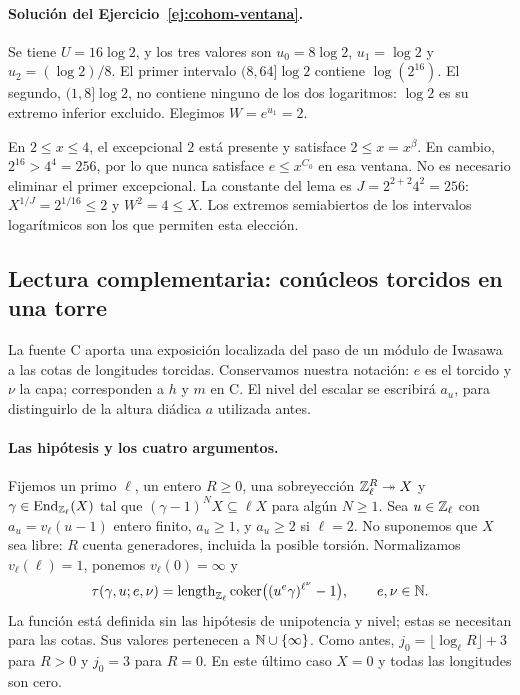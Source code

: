 \paragraph{Solución del Ejercicio~\ref{ej:cohom-ventana}.}
Se tiene $U=16\log2$, y los tres valores son
$u_0=8\log2$, $u_1=\log2$ y
$u_2=(\log2)/8$.
El primer intervalo $(8,64]\log2$ contiene
$\log(2^{16})$.
El segundo, $(1,8]\log2$, no contiene ninguno de los
dos logaritmos: $\log2$ es su extremo inferior
excluido. Elegimos $W=e^{u_1}=2$.

En $2\le x\le4$, el excepcional $2$ está presente
y satisface $2\le x=x^\beta$.
En cambio, $2^{16}>4^4=256$, por lo que nunca
satisface $e\le x^{C_0}$ en esa ventana.
No es necesario eliminar el primer excepcional.
La constante del lema es
$J=2^{2+2}4^2=256$:
$X^{1/J}=2^{1/16}\le2$ y $W^2=4\le X$.
Los extremos semiabiertos de los intervalos
logarítmicos son los que permiten esta elección.

\subsection{Lectura complementaria: conúcleos torcidos en una torre}
\label{subsec:cohom-fuente-c}


La fuente C aporta una exposición localizada del paso de un módulo
de Iwasawa a las cotas de longitudes torcidas. Conservamos nuestra
notación: $e$ es el torcido y $\nu$ la capa; corresponden a $h$ y $m$
en C. El nivel del escalar se escribirá $a_u$, para distinguirlo
de la altura diádica $a$ utilizada antes.

\paragraph{Las hipótesis y los cuatro argumentos.}
Fijemos un primo $\ell$, un entero $R\ge0$, una sobreyección
$\mathbb{Z}_\ell^R\twoheadrightarrow X$
y $\gamma\in\operatorname{End}_{\mathbb{Z}_\ell}(X)$ tal que
$(\gamma-1)^N X\subseteq\ell X$ para algún $N\ge1$.
Sea $u\in\mathbb{Z}_\ell$ con
$a_u=v_\ell(u-1)$ entero finito, $a_u\ge1$, y $a_u\ge2$ si $\ell=2$.
No suponemos que $X$ sea libre: $R$ cuenta generadores, incluida
la posible torsión. Normalizamos $v_\ell(\ell)=1$, ponemos
$v_\ell(0)=\infty$ y
\[
 \tau(\gamma,u;e,\nu)=
 \operatorname{length}_{\mathbb{Z}_\ell}\operatorname{coker}
       \bigl((u^e\gamma)^{\ell^\nu}-1\bigr),
 \qquad e,\nu\in\mathbb{N}.
\]
La función está definida sin las hipótesis de unipotencia y nivel;
estas se necesitan para las cotas. Sus valores pertenecen a
$\mathbb{N}\cup\{\infty\}$. Como antes,
$j_0=\lfloor\log_\ell R\rfloor+3$ para $R>0$ y $j_0=3$ para $R=0$.
En este último caso $X=0$ y todas las longitudes son cero.

